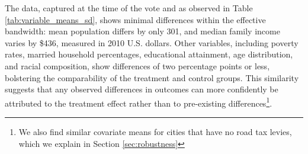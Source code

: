 The data, captured at the time of the vote and as observed in Table \ref{tab:variable_means_sd}, shows minimal differences within the effective bandwidth: mean population differs by only 301, and median family income varies by \$436, measured in 2010 U.S. dollars. Other variables, including poverty rates, married household percentages, educational attainment, age distribution, and racial composition, show differences of two percentage points or less, bolstering the comparability of the treatment and control groups. This similarity suggests that any observed differences in outcomes can more confidently be attributed to the treatment effect rather than to pre-existing differences\footnote{We also find similar covariate means for cities that have no road tax levies, which we explain in Section \ref{sec:robustness}}.

